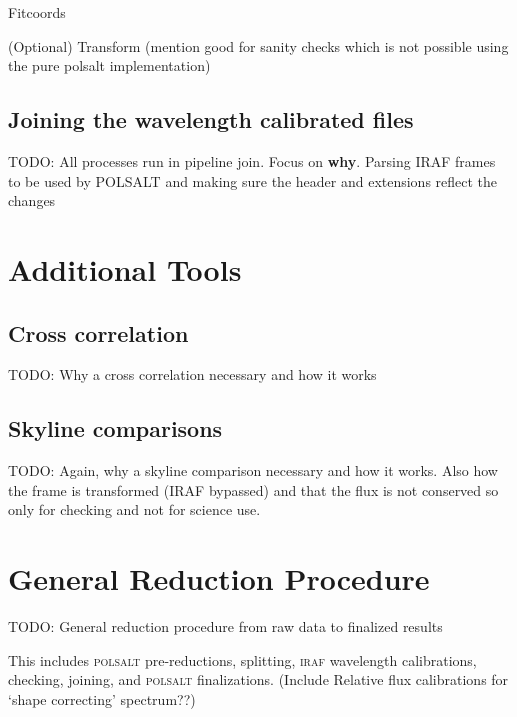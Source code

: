 Fitcoords

(Optional) Transform (mention good for sanity checks which is not possible using the pure polsalt implementation)

\subsection{Joining the wavelength calibrated files}

TODO: All processes run in pipeline join.
Focus on \textbf{why}. Parsing IRAF frames to be used by POLSALT and making sure the header and extensions reflect the changes

\section{Additional Tools}

\subsection{Cross correlation}

TODO: Why a cross correlation necessary and how it works

\subsection{Skyline comparisons}

TODO: Again, why a skyline comparison necessary and how it works. Also how the frame is transformed (IRAF bypassed) and that the flux is not conserved so only for checking and not for science use.

\section{General Reduction Procedure}

TODO: General reduction procedure from raw data to finalized results

This includes \textsc{polsalt} pre-reductions, splitting, \textsc{iraf} wavelength calibrations, checking, joining, and \textsc{polsalt} finalizations. (Include Relative flux calibrations for `shape correcting' spectrum??)